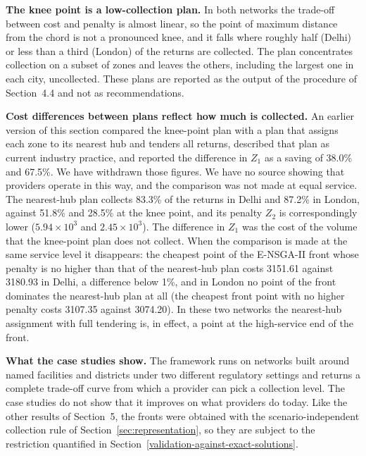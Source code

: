 \documentclass[11pt, a4paper]{article}
\begin{document}
\textbf{The knee point is a low-collection plan.} In both networks the trade-off between cost and penalty is almost linear, so the point of maximum distance from the chord is not a pronounced knee, and it falls where roughly half (Delhi) or less than a third (London) of the returns are collected. The plan concentrates collection on a subset of zones and leaves the others, including the largest one in each city, uncollected. These plans are reported as the output of the procedure of Section~4.4 and not as recommendations.

\textbf{Cost differences between plans reflect how much is collected.} An earlier version of this section compared the knee-point plan with a plan that assigns each zone to its nearest hub and tenders all returns, described that plan as current industry practice, and reported the difference in $Z_1$ as a saving of 38.0\% and 67.5\%. We have withdrawn those figures. We have no source showing that providers operate in this way, and the comparison was not made at equal service. The nearest-hub plan collects 83.3\% of the returns in Delhi and 87.2\% in London, against 51.8\% and 28.5\% at the knee point, and its penalty $Z_2$ is correspondingly lower ($5.94\times10^{3}$ and $2.45\times10^{3}$). The difference in $Z_1$ was the cost of the volume that the knee-point plan does not collect. When the comparison is made at the same service level it disappears: the cheapest point of the E-NSGA-II front whose penalty is no higher than that of the nearest-hub plan costs 3151.61 against 3180.93 in Delhi, a difference below 1\%, and in London no point of the front dominates the nearest-hub plan at all (the cheapest front point with no higher penalty costs 3107.35 against 3074.20). In these two networks the nearest-hub assignment with full tendering is, in effect, a point at the high-service end of the front.

\textbf{What the case studies show.} The framework runs on networks built around named facilities and districts under two different regulatory settings and returns a complete trade-off curve from which a provider can pick a collection level. The case studies do not show that it improves on what providers do today. Like the other results of Section~5, the fronts were obtained with the scenario-independent collection rule of Section~\ref{sec:representation}, so they are subject to the restriction quantified in Section~\ref{validation-against-exact-solutions}.
\end{document}
